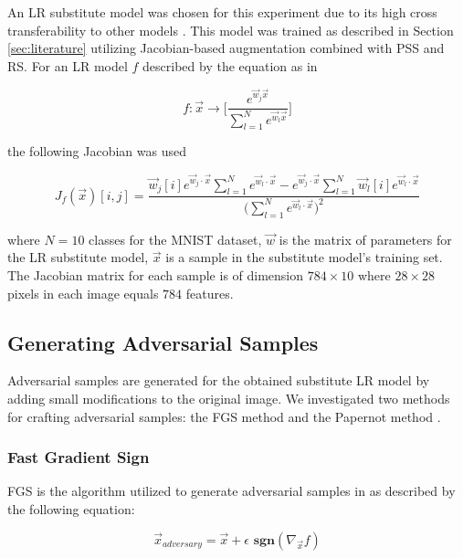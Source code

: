 An LR substitute model was chosen for this experiment due to its high cross transferability to other models \cite{papernot3}. This model was trained as described in Section \ref{sec:literature} utilizing Jacobian-based augmentation combined with PSS and RS. For an LR model $f$ described by the equation as in \cite{papernot3}

\begin{equation} \label{LR_prob}
	f: \vec{x} \rightarrow \Bigg[ \frac{e^{\vec{w}_{j}\vec{x}}}{\sum_{l=1}^{N}e^{\vec{w}_{l}\vec{x}}} \Bigg]
\end{equation}

the following Jacobian was used

\begin{equation}
	J_{f}(\vec{x})[i,j] = \frac{\vec{w}_{j}[i] e^{\vec{w}_{j}\cdot \vec{x}}\sum_{l=1}^{N}e^{\vec{w}_{l} \cdot \vec{x}} - e^{\vec{w}_{j} \cdot \vec{x}}\sum_{l=1}^{N}\vec{w}_{l}[i]e^{\vec{w}_{l} \cdot \vec{x}}}{\bigg(\sum_{l=1}^{N}e^{\vec{w}_{l} \cdot \vec{x}}\bigg)^{2}}
\end{equation}

where $N = 10$ classes for the MNIST dataset, $\vec{w}$ is the matrix of parameters for the LR substitute model, $\vec{x}$ is a sample in the substitute model's training set. The Jacobian matrix for each sample is of dimension $784 \times 10$ where $28 \times 28$ pixels in each image equals $784$ features. 

\subsection{Generating Adversarial Samples}
Adversarial samples are generated for the obtained substitute LR model by adding small modifications to the original image. We investigated two methods for crafting adversarial samples: the FGS method \cite{fast_gradient_sign} and the Papernot method \cite{papernot1}.

\subsubsection{Fast Gradient Sign}
FGS is the algorithm utilized to generate adversarial samples in \cite{papernot3} as described by the following equation:

\begin{equation} \label{eqn:fast_gradient_sign}
	\vec{x}_{adversary} = \vec{x} + \epsilon \textbf{ sgn}(\nabla_{\vec{x}}f) 
\end{equation}

